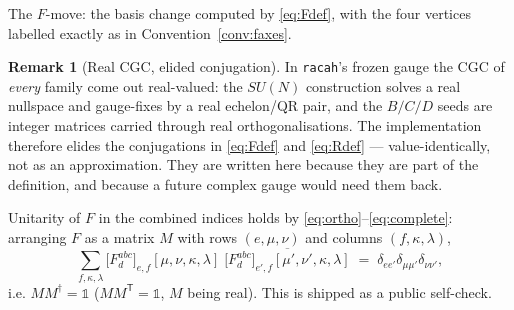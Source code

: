 \documentclass[11pt,a4paper]{article}
\theoremstyle{plain}
\theoremstyle{definition}
\newtheorem{remark}[theorem]{Remark}
\newcommand{\fvert}[2]{\node[fvertex] at (#1) {};%
  \node[fleg, right=1pt] at (#1) {$#2$};}
\newcommand{\id}{\mathbb{1}}
\newcommand{\code}[1]{\texttt{#1}}
\begin{document}
\begin{center}

\smallskip
{\small The $F$-move: the basis change computed by \eqref{eq:Fdef}, with the
four vertices labelled exactly as in Convention~\ref{conv:faxes}.}
\end{center}

\begin{remark}[Real CGC, elided conjugation]\label{rem:real}
In \code{racah}'s frozen gauge the CGC of \emph{every} family come out
real-valued: the $SU(N)$ construction solves a real nullspace and gauge-fixes
by a real echelon/QR pair, and the $B/C/D$ seeds are integer matrices carried
through real orthogonalisations. The implementation therefore elides the
conjugations in \eqref{eq:Fdef} and \eqref{eq:Rdef} --- value-identically, not
as an approximation. They are written here because they are part of the
definition, and because a future complex gauge would need them back.
\end{remark}

Unitarity of $F$ in the combined indices holds by
\eqref{eq:ortho}--\eqref{eq:complete}: arranging $F$ as a matrix $M$ with rows
$(e,\mu,\nu)$ and columns $(f,\kappa,\lambda)$,
\begin{equation}\label{eq:funitary}
  \sum_{f,\kappa,\lambda}
    \bigl[F^{abc}_d\bigr]_{e,f}[\mu,\nu,\kappa,\lambda]\;
    \overline{\bigl[F^{abc}_d\bigr]_{e',f}[\mu',\nu',\kappa,\lambda]}
  \;=\; \delta_{ee'}\delta_{\mu\mu'}\delta_{\nu\nu'} ,
\end{equation}
i.e. $M M^\dagger = \id$ ($M M^{\mathsf T} = \id$, $M$ being real). This is
shipped as a public self-check.
\end{document}
